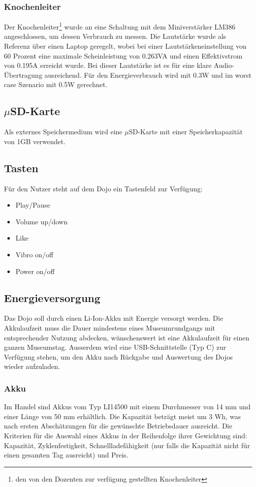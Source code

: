 \subsubsection{Knochenleiter}
Der Knochenleiter\footnote{den von den Dozenten zur verfügung gestellten Knochenleiter} wurde an eine Schaltung mit dem Miniverstärker LM386 angeschlossen, um dessen Verbrauch zu messen. Die Lautstärke wurde als Referenz über einen Laptop geregelt, wobei bei einer Lautstärkeneinstellung von 60 Prozent eine maximale Scheinleistung von 0.263VA und einen Effektivstrom von 0.195A erreicht wurde. Bei dieser Lautstärke ist es für eine klare Audio-Übertragung ausreichend. Für den Energieverbrauch wird mit 0.3W und im worst case Szenario mit 0.5W gerechnet.
\subsection{$\mu$SD-Karte}
Als externes Speichermedium wird eine $\mu$SD-Karte mit einer Speicherkapazität von 1GB verwendet.
\subsection{Tasten}
Für den Nutzer steht auf dem Dojo ein Tastenfeld zur Verfügung:\\
\begin{itemize}
	\item Play/Pause
	\item Volume up/down
	\item Like
	\item Vibro on/off
	\item Power on/off\\
\end{itemize}
\subsection{Energieversorgung}
Das Dojo soll durch einen Li-Ion-Akku mit Energie versorgt werden. Die Akkulaufzeit muss die Dauer mindestens eines Museumrundgangs mit entsprechender Nutzung abdecken, wünschenswert ist eine Akkulaufzeit für einen ganzen Museumstag. Ausserdem wird eine USB-Schnittstelle (Typ C) zur Verfügung stehen, um den Akku nach Rückgabe und Auswertung des Dojos wieder aufzuladen. 
\subsubsection{Akku}
Im Handel sind Akkus vom Typ LI14500 mit einem Durchmesser von 14 mm und einer Länge von 50 mm erhältlich. Die Kapazität beträgt meist um 3 Wh, was nach ersten Abschätzungen für die gewünschte Betriebsdauer ausreicht. Die Kriterien für die Auswahl eines Akkus in der Reihenfolge ihrer Gewichtung sind: Kapazität, Zyklenfestigkeit, Schnellladefähigkeit (nur falls die Kapazität nicht für einen gesamten Tag ausreicht) und Preis. 
